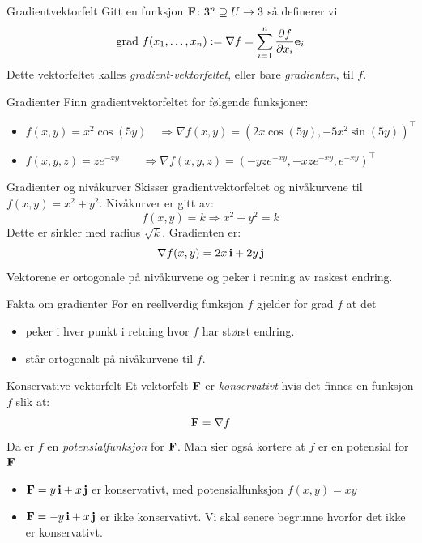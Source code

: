 \begin{defn}{Gradientvektorfelt}
Gitt en funksjon  $\mathbf{F}\colon 3^n \supseteq U \rightarrow 3$ så definerer vi
\[
\text{grad } f (x_1,\ldots, x_n) :=\nabla f= \sum_{i=1}^n \frac{\partial f}{\partial x_i}\mathbf{e}_i
\]
Dette vektorfeltet kalles \emph{gradient-vektorfeltet}, eller bare \textit{gradienten}, til $f$.
\end{defn}

\begin{eks}{Gradienter}
Finn gradientvektorfeltet for følgende funksjoner:
\begin{itemize}
  \item[a)] $f(x, y) = x^2\cos(5y) \quad  \Rightarrow \nabla f (x,y)= (2x\cos(5y), -5x^2\sin(5y) )^\top$
  \item[b)] $f(x, y, z) = ze^{-xy} \qquad  \Rightarrow \nabla f(x,y,z) = ( -yze^{-xy}, -xze^{-xy}, e^{-xy} )^\top$
\end{itemize}
\end{eks}
\begin{eks}{Gradienter og nivåkurver}
Skisser gradientvektorfeltet og nivåkurvene til $f(x, y) = x^2 + y^2$. Nivåkurver er gitt av:
\[
f(x, y) = k \Rightarrow x^2 + y^2 = k
\]
Dette er sirkler med radius $\sqrt{k}$.
Gradienten er:
\[
\nabla f(x, y) = 2x\,\mathbf{i} + 2y\,\mathbf{j}
\]
Vektorene er ortogonale på nivåkurvene og peker i retning av raskest endring.
\end{eks}
\begin{oppsum}{Fakta om gradienter}
For en reellverdig funksjon $f$ gjelder for grad $f$ at det
\begin{itemize}
\item peker i hver punkt i retning hvor $f$ har størst endring.
\item står ortogonalt på nivåkurvene til $f$.
\end{itemize}
\end{oppsum}
\begin{defn}{Konservative vektorfelt}
Et vektorfelt $\mathbf{F}$ er \emph{konservativt} hvis det finnes en funksjon $f$ slik at:
\[
\mathbf{F} = \nabla f
\]
Da er $f$ en \emph{potensialfunksjon} for $\mathbf{F}$. Man sier også kortere at $f$ er en potensial for $\mathbf{F}$
\end{defn}

\begin{eks}{}
\begin{itemize}
    \item $\mathbf{F} = y\, \mathbf{i} + x\, \mathbf{j}$ er konservativt, med potensialfunksjon $f(x, y) = xy$
    \item $\mathbf{F} = -y\, \mathbf{i} + x\, \mathbf{j}$ er ikke konservativt. Vi skal senere begrunne hvorfor det ikke er konservativt.
\end{itemize}
\end{eks}

